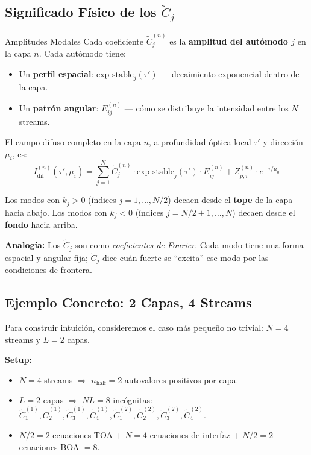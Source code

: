 \documentclass[a4paper,11pt]{article}
\begin{document}
\subsection{Significado F\'isico de los $\widetilde{C}_j$}

\begin{physics}{Amplitudes Modales}
Cada coeficiente $\widetilde{C}_j^{(n)}$ es la \textbf{amplitud del autómodo $j$} en la capa $n$.  Cada autómodo tiene:
\begin{itemize}
\item Un \textbf{perfil espacial}: $\text{exp\_stable}_j(\tau')$ --- decaimiento exponencial dentro de la capa.
\item Un \textbf{patr\'on angular}: $E_{ij}^{(n)}$ --- c\'omo se distribuye la intensidad entre los $N$ streams.
\end{itemize}

El campo difuso completo en la capa $n$, a profundidad \'optica local $\tau'$ y direcci\'on $\mu_i$, es:
\begin{equation}
I_{\text{dif}}^{(n)}(\tau', \mu_i) = \sum_{j=1}^{N} \widetilde{C}_j^{(n)} \cdot \text{exp\_stable}_j(\tau') \cdot E_{ij}^{(n)} + Z_{p,i}^{(n)} \cdot e^{-\tau/\mu_0}
\end{equation}

Los modos con $k_j > 0$ (\'indices $j = 1, \ldots, N/2$) decaen desde el \textbf{tope} de la capa hacia abajo.  Los modos con $k_j < 0$ (\'indices $j = N/2+1, \ldots, N$) decaen desde el \textbf{fondo} hacia arriba.

\textbf{Analog\'ia:}  Los $\widetilde{C}_j$ son como \textit{coeficientes de Fourier}.  Cada modo tiene una forma espacial y angular fija; $\widetilde{C}_j$ dice cu\'an fuerte se ``excita'' ese modo por las condiciones de frontera.
\end{physics}

\subsection{Ejemplo Concreto: 2 Capas, 4 Streams}

Para construir intuici\'on, consideremos el caso m\'as peque\~no no trivial: $N = 4$ streams y $L = 2$ capas.

\textbf{Setup:}
\begin{itemize}
\item $N = 4$ streams $\Rightarrow$ $n_{\text{half}} = 2$ autovalores positivos por capa.
\item $L = 2$ capas $\Rightarrow$ $NL = 8$ inc\'ognitas: $\widetilde{C}_1^{(1)}, \widetilde{C}_2^{(1)}, \widetilde{C}_3^{(1)}, \widetilde{C}_4^{(1)}, \widetilde{C}_1^{(2)}, \widetilde{C}_2^{(2)}, \widetilde{C}_3^{(2)}, \widetilde{C}_4^{(2)}$.
\item $N/2 = 2$ ecuaciones TOA + $N = 4$ ecuaciones de interfaz + $N/2 = 2$ ecuaciones BOA $= 8$.
\end{itemize}
\end{document}
